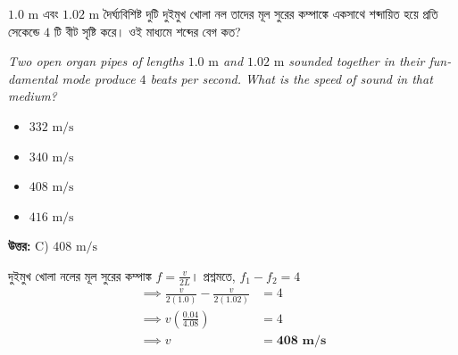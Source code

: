 \documentclass[12pt, a4paper]{article}
\begin{document}
\begin{tcolorbox}[questionbox={প্রশ্ন (Question) 14}]
    \noindent
    $1.0\text{ m}$ এবং $1.02\text{ m}$ দৈর্ঘ্যবিশিষ্ট দুটি দুইমুখ খোলা নল তাদের মূল সুরের কম্পাঙ্কে একসাথে শব্দায়িত হয়ে প্রতি সেকেন্ডে $4$ টি বীট সৃষ্টি করে। ওই মাধ্যমে শব্দের বেগ কত?
    
    \vspace{0.8em}
    \begin{english}
    \noindent\textit{\color{darkgray}
    Two open organ pipes of lengths $1.0\text{ m}$ and $1.02\text{ m}$ sounded together in their fundamental mode produce $4$ beats per second. What is the speed of sound in that medium?
    }
    \end{english}
\end{tcolorbox}

\begin{itemize}[label={}, leftmargin=1cm, itemsep=0.5em]
    \item[\textbf{A)}] $332\text{ m/s}$
    \item[\textbf{B)}] $340\text{ m/s}$
    \item[\textbf{C)}] $408\text{ m/s}$
    \item[\textbf{D)}] $416\text{ m/s}$
\end{itemize}

\vspace{0.5em}
\begin{tcolorbox}[answerbox]
    \textbf{\color{success} উত্তর:} C) $408\text{ m/s}$
\end{tcolorbox}
\vspace{1em}

\begin{tcolorbox}[solutionbox={সমাধান (Solution)}]
    \noindent
    দুইমুখ খোলা নলের মূল সুরের কম্পাঙ্ক $f = \frac{v}{2L}$। প্রশ্নমতে, $f_1 - f_2 = 4$
    \begin{align*}
        \implies \frac{v}{2(1.0)} - \frac{v}{2(1.02)} &= 4 \\
        \implies v \left( \frac{0.04}{4.08} \right) &= 4 \\
        \implies v &= \mathbf{408\text{ m/s}}
    \end{align*}
\end{tcolorbox}

\vspace{2em}
\end{document}
